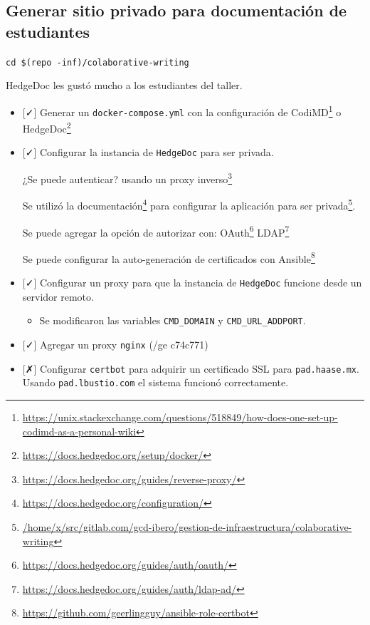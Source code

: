 \documentclass[
  12,
]{scrartcl}
\DeclareRobustCommand{\href}[2]{#2\footnote{\url{#1}}}
\providecommand{\tightlist}{%
  \setlength{\itemsep}{0pt}\setlength{\parskip}{0pt}}
\begin{document}
\hypertarget{generar-sitio-privado-para-documentaciuxf3n-de-estudiantes}{%
\subsection{Generar sitio privado para documentación de
estudiantes}\label{generar-sitio-privado-para-documentaciuxf3n-de-estudiantes}}

\texttt{cd\ \$(repo\ -inf)/colaborative-writing}

HedgeDoc les gustó mucho a los estudiantes del taller.

\begin{itemize}
\item
  {[}✓{]} Generar un \texttt{docker-compose.yml} con la configuración de
  \href{https://unix.stackexchange.com/questions/518849/how-does-one-set-up-codimd-as-a-personal-wiki}{CodiMD}
  o \href{https://docs.hedgedoc.org/setup/docker/}{HedgeDoc}
\item
  {[}✓{]} Configurar la instancia de \texttt{HedgeDoc} para ser privada.

  ¿Se puede autenticar?
  \href{https://docs.hedgedoc.org/guides/reverse-proxy/}{usando un proxy
  inverso}

  Se utilizó \href{https://docs.hedgedoc.org/configuration/}{la
  documentación} para
  \href{/home/x/src/gitlab.com/gcd-ibero/gestion-de-infraestructura/colaborative-writing}{configurar
  la aplicación para ser privada}.

  Se puede agregar la opción de autorizar con:
  \href{https://docs.hedgedoc.org/guides/auth/oauth/}{OAuth}
  \href{https://docs.hedgedoc.org/guides/auth/ldap-ad/}{LDAP}

  \href{https://github.com/geerlingguy/ansible-role-certbot}{Se puede
  configurar la auto-generación de certificados con Ansible}
\item
  {[}✓{]} Configurar un proxy para que la instancia de \texttt{HedgeDoc}
  funcione desde un servidor remoto.

  \begin{itemize}
  \tightlist
  \item
    Se modificaron las variables \texttt{CMD\_DOMAIN} y
    \texttt{CMD\_URL\_ADDPORT}.
  \end{itemize}
\item
  {[}✓{]} Agregar un proxy \texttt{nginx} (/ge c74c771)
\item
  {[}✗{]} Configurar \texttt{certbot} para adquirir un certificado SSL
  para \texttt{pad.haase.mx}. Usando \texttt{pad.lbustio.com} el sistema
  funcionó correctamente.


\end{itemize}
\end{document}
